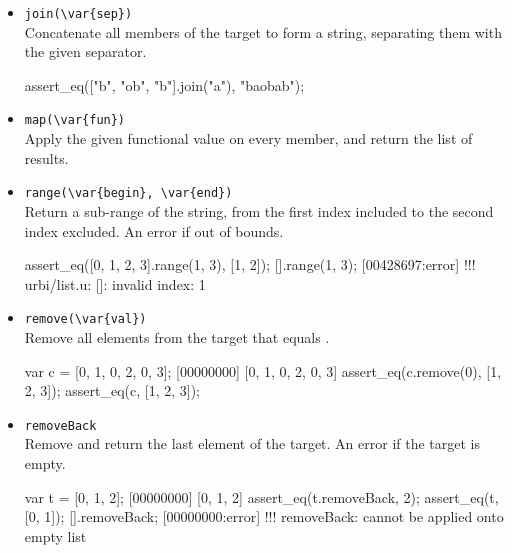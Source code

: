 \begin{itemize}
\item \lstinline|join(\var{sep})|\\
Concatenate all members of the target to form a string, separating
them with the given separator.

\begin{urbiscript}[firstnumber=last]
assert_eq(["b", "ob", "b"].join("a"), "baobab");
\end{urbiscript}

\item \lstinline|map(\var{fun})|\\
Apply the given functional value on every member, and return the list
of results.


\item \lstinline|range(\var{begin}, \var{end})|\\
Return a sub-range of the string, from the first index included to the
second index excluded. An error if out of bounds.

\begin{urbiscript}[firstnumber=last]
assert_eq([0, 1, 2, 3].range(1, 3), [1, 2]);
[].range(1, 3);
[00428697:error] !!! urbi/list.u: []: invalid index: 1
\end{urbiscript}


\item \lstinline|remove(\var{val})|\\
Remove all elements from the target that equals .

\begin{urbiscript}[firstnumber=last]
var c = [0, 1, 0, 2, 0, 3];
[00000000] [0, 1, 0, 2, 0, 3]
assert_eq(c.remove(0), [1, 2, 3]);
assert_eq(c, [1, 2, 3]);
\end{urbiscript}

\item \lstinline|removeBack|\\
Remove and return the last element of the target. An error if the
target is empty.

\begin{urbiscript}[firstnumber=last]
var t = [0, 1, 2];
[00000000] [0, 1, 2]
assert_eq(t.removeBack, 2);
assert_eq(t, [0, 1]);
[].removeBack;
[00000000:error] !!! removeBack: cannot be applied onto empty list
\end{urbiscript}


\end{itemize}
